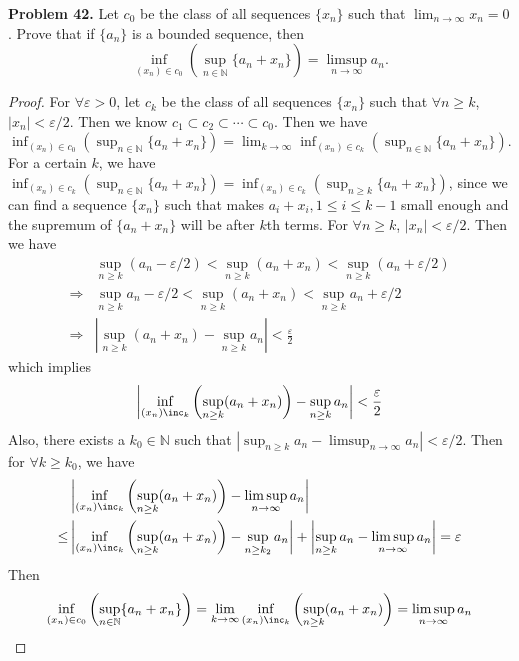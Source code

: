 \documentclass[12pt,leqno]{amsart}
\begin{document}
\noindent
{\bf Problem 42.}
Let $c_0$ be the class of all sequences $\{x_n\}$ such that $\displaystyle\lim_{n\to\infty} x_n=0$. Prove that if
$\{a_n\}$ is a bounded sequence, then
$$
\inf_{(x_n)\in c_0}\left(\sup_{n\in\mathbb{N}}\{ a_n+x_n\}\right) = \limsup_{n\to\infty} a_n.
$$
\begin{proof}
For $\forall \varepsilon>0$, let $c_k$ be the class of all sequences $\{x_n\}$ such that $\forall n\geq k$, $|x_n|<\varepsilon/2$. Then we know $c_1\subset c_2 \subset \cdots \subset c_0$. Then we have $\inf_{(x_n)\in c_0}\left(\sup_{n\in\mathbb{N}}\{a_n+x_n\} \right)=\lim_{k\to\infty}\inf_{(x_n)\in c_k}\left(\sup_{n\in\mathbb{N}}\{a_n+x_n\} \right)$. \\
\hspace*{3em}For a certain $k$, we have $\inf_{(x_n)\in c_k} \left( \sup_{n\in\mathbb{N}} \{a_n+x_n\} \right)=\inf_{(x_n)\in c_k} \left( \sup_{n\geq k} \{a_n+x_n\} \right)$, since we can find a sequence $\{x_n\}$ such that makes $a_i+x_i, 1\leq i\leq k-1$ small enough and the supremum of $\{a_n+x_n\}$ will be after $k$th terms. For $\forall n\geq k$, $|x_n|<\varepsilon/2$. Then we have 
\begin{align*}
    &\sup_{n\geq k}\left(a_n-\varepsilon/2 \right) < \sup_{n\geq k}\left(a_n+x_n \right) < \sup_{n\geq k}\left(a_n+\varepsilon/2 \right) \\
    \Rightarrow & \sup_{n\geq k}a_n-\varepsilon/2  < \sup_{n\geq k}\left(a_n+x_n \right) < \sup_{n\geq k}a_n +\varepsilon/2 \\
    \Rightarrow & \left|\sup_{n\geq k}(a_n+x_n) - \sup_{n\geq k}a_n\right| < \frac{\varepsilon}{2}
\end{align*}
which implies 
\begin{align*}
    \left|\inf_{(x_n)\inc_k}\left( \sup_{n\geq k}(a_n+x_n) \right)- \sup_{n\geq k}a_n\right| < \frac{\varepsilon}{2}
\end{align*}
Also, there exists a $k_0\in\mathbb{N}$ such that $\left|\sup_{n\geq k} a_n - \limsup_{n\to\infty}a_n \right|<\varepsilon/2$. Then for $\forall k\geq k_0$, we have 
\begin{align*}
    &\left|\inf_{(x_n)\inc_k}\left( \sup_{n\geq k}(a_n+x_n) \right)- \limsup_{n\to\infty}a_n\right|\\
    \leq & \left|\inf_{(x_n)\inc_k}\left( \sup_{n\geq k}(a_n+x_n) \right)- \sup_{n\geq k_2}a_n\right| + \left|\sup_{n\geq k} a_n - \limsup_{n\to\infty}a_n \right| = \varepsilon
\end{align*}
Then 
\begin{align*}
    \inf_{(x_n)\in c_0}\left(\sup_{n\in\mathbb{N}}\{ a_n+x_n\}\right) = \lim_{k\to\infty}\inf_{(x_n)\inc_k}\left( \sup_{n\geq k}(a_n+x_n) \right) = \limsup_{n\to\infty}a_n
\end{align*}
\end{proof}



\medskip
\end{document}
